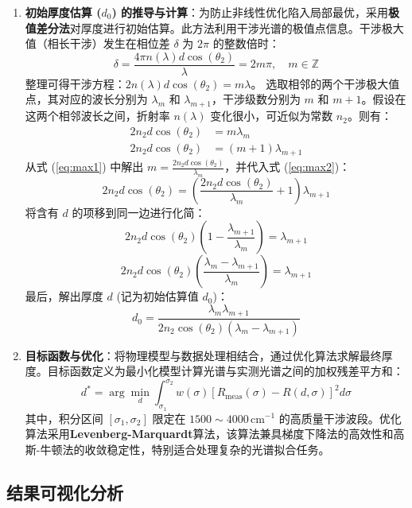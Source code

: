 \documentclass[withoutpreface,bwprint]{cumcmthesis} %
\begin{document}
\begin{enumerate}
    \item \textbf{初始厚度估算 ($d_0$) 的推导与计算}：为防止非线性优化陷入局部最优，采用\textbf{极值差分法}对厚度进行初始估算。此方法利用干涉光谱的极值点信息。干涉极大值（相长干涉）发生在相位差 $\delta$ 为 $2\pi$ 的整数倍时：
    \[ \delta = \frac{4\pi n(\lambda)d \cos(\theta_2)}{\lambda} = 2m\pi, \quad m \in \mathbb{Z} \]
    整理可得干涉方程：$2n(\lambda)d \cos(\theta_2) = m\lambda$。
    选取相邻的两个干涉极大值点，其对应的波长分别为 $\lambda_m$ 和 $\lambda_{m+1}$，干涉级数分别为 $m$ 和 $m+1$。假设在这两个相邻波长之间，折射率 $n(\lambda)$ 变化很小，可近似为常数 $n_2$。则有：
    \begin{align}
    2n_2 d \cos(\theta_2) &= m \lambda_m \label{eq:max1} \\
    2n_2 d \cos(\theta_2) &= (m+1) \lambda_{m+1} \label{eq:max2}
    \end{align}
    从式 (\ref{eq:max1}) 中解出 $m = \frac{2n_2 d \cos(\theta_2)}{\lambda_m}$，并代入式 (\ref{eq:max2})：
    \[ 2n_2 d \cos(\theta_2) = \left( \frac{2n_2 d \cos(\theta_2)}{\lambda_m} + 1 \right) \lambda_{m+1} \]
    将含有 $d$ 的项移到同一边进行化简：
    \[ 2n_2 d \cos(\theta_2) \left( 1 - \frac{\lambda_{m+1}}{\lambda_m} \right) = \lambda_{m+1} \]
    \[ 2n_2 d \cos(\theta_2) \left( \frac{\lambda_m - \lambda_{m+1}}{\lambda_m} \right) = \lambda_{m+1} \]
    最后，解出厚度 $d$ (记为初始估算值 $d_0$)：
    \begin{equation}
    d_0 = \frac{\lambda_m \lambda_{m+1}}{2n_2 \cos(\theta_2) (\lambda_m - \lambda_{m+1})}
    \label{eq:d0}
    \end{equation}

    \item \textbf{目标函数与优化}：将物理模型与数据处理相结合，通过优化算法求解最终厚度。目标函数定义为最小化模型计算光谱与实测光谱之间的加权残差平方和：
    \begin{equation}
    d^* = \arg\min_d \int_{\sigma_1}^{\sigma_2} w(\sigma) \left[ R_{\text{meas}}(\sigma) - R(d, \sigma) \right]^2 d\sigma
    \label{eq:objective_function}
    \end{equation}
    其中，积分区间 $[\sigma_1, \sigma_2]$ 限定在 $1500 \sim 4000 \, \text{cm}^{-1}$ 的高质量干涉波段。优化算法采用\textbf{Levenberg-Marquardt}算法，该算法兼具梯度下降法的高效性和高斯-牛顿法的收敛稳定性，特别适合处理复杂的光谱拟合任务。
\end{enumerate}

\clearpage

\subsection{结果可视化分析}
\end{document}

